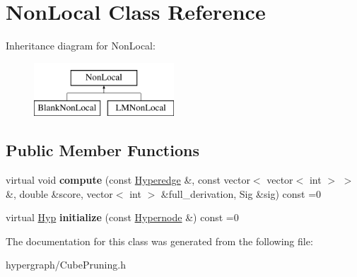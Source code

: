 \hypertarget{classNonLocal}{
\section{NonLocal Class Reference}
\label{classNonLocal}
}
Inheritance diagram for NonLocal:\begin{figure}[H]
\begin{center}
\leavevmode
\includegraphics[height=2cm]{classNonLocal}
\end{center}
\end{figure}
\subsection*{Public Member Functions}
\begin{DoxyCompactItemize}
\item 
\hypertarget{classNonLocal_acd66e7882a5bb3415d3fd658d03ec8fc}{
virtual void {\bfseries compute} (const \hyperlink{classScarab_1_1HG_1_1Hyperedge}{Hyperedge} \&, const vector$<$ vector$<$ int $>$ $>$ \&, double \&score, vector$<$ int $>$ \&full\_\-derivation, Sig \&sig) const =0}
\label{classNonLocal_acd66e7882a5bb3415d3fd658d03ec8fc}

\item 
\hypertarget{classNonLocal_a90f2d399853f5c689a0abdc5c12a8370}{
virtual \hyperlink{structHyp}{Hyp} {\bfseries initialize} (const \hyperlink{classScarab_1_1HG_1_1Hypernode}{Hypernode} \&) const =0}
\label{classNonLocal_a90f2d399853f5c689a0abdc5c12a8370}

\end{DoxyCompactItemize}


The documentation for this class was generated from the following file:\begin{DoxyCompactItemize}
\item 
hypergraph/CubePruning.h\end{DoxyCompactItemize}
